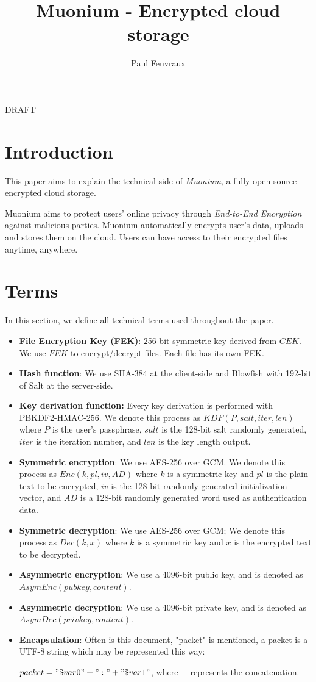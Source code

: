 \documentclass[a4paper,10pt]{article}
\title{Muonium - Encrypted cloud storage}
\author{Paul Feuvraux}
\begin{document}
\maketitle

DRAFT


\section{Introduction}
This paper aims to explain the technical side of \emph{Muonium}, a fully open source encrypted cloud storage.


Muonium aims to protect users' online privacy through \emph{End-to-End Encryption} against malicious parties.
Muonium automatically encrypts user's data, uploads and stores them on the cloud. Users can have access to their encrypted files anytime, anywhere.

\section{Terms}
In this section, we define all technical terms used throughout the paper.

\begin{itemize}
    \item \textbf{File Encryption Key (FEK)}:
        256-bit symmetric key derived from $CEK$. We use $FEK$ to encrypt/decrypt files. Each file has its own FEK.
    \item \textbf{Hash function}: We use SHA-384 at the client-side and Blowfish with 192-bit of Salt at the server-side.
    \item \textbf{Key derivation function:} Every key derivation is performed with PBKDF2-HMAC-256. We denote this process as
		$KDF(P,salt, iter, len)$ where $P$ is the user's passphrase, $salt$ is the 128-bit salt randomly generated, $iter$ is the
		iteration number, and $len$ is the key length output.
    \item \textbf{Symmetric encryption}: We use AES-256 over GCM.
        We denote this process as $Enc(k,pl, iv, AD)$ where $k$ is a symmetric key and $pl$ is the plain-text to be encrypted,
				$iv$ is the 128-bit randomly generated initialization vector, and $AD$ is a 128-bit randomly generated word used as
				authentication data.
    \item \textbf{Symmetric decryption}: We use AES-256 over GCM;
        We denote this process as $Dec(k, x)$ where $k$ is a symmetric key and $x$ is the encrypted text to be decrypted.
	\item \textbf{Asymmetric encryption}: We use a 4096-bit public key, and is denoted as $AsymEnc(pubkey, content)$.
	\item \textbf{Asymmetric decryption}: We use a 4096-bit private key, and is denoted as $AsymDec(privkey, content)$.
	\item \textbf{Encapsulation}:
	Often is this document, "packet" is mentioned, a packet is a UTF-8 string which may be represented this way:

	\vspace{5mm}

	$packet="\$var0"+":"+"\$var1"$, where $+$ represents the concatenation.

\end{itemize}
\end{document}
